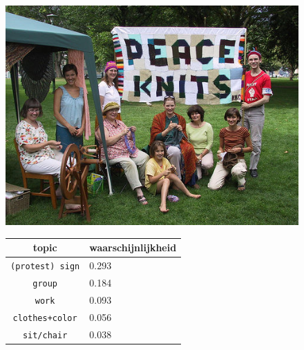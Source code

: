 \begin{figure}[h]
    \centering
    \begin{minipage}[t]{.5\linewidth}
    \centering
    \vspace{0pt}
    \includegraphics[width=\textwidth]{Images/LDA/4386588.jpg}
    \end{minipage}\hfill
    \begin{minipage}[t]{.5\textwidth}
    \centering
    \vspace{0pt}
    \begin{tabularx}{\textwidth}{cl}
            topic                           & waarschijnlijkheid\\
            \hline
            \texttt{(protest) sign} & 0.293\\
            \texttt{group} & 0.184\\
            \texttt{work} & 0.093\\
            \texttt{clothes+color} & 0.056\\
            \texttt{sit/chair} & 0.038\\
            \hline
        \end{tabularx}
    \end{minipage}
\end{figure}

